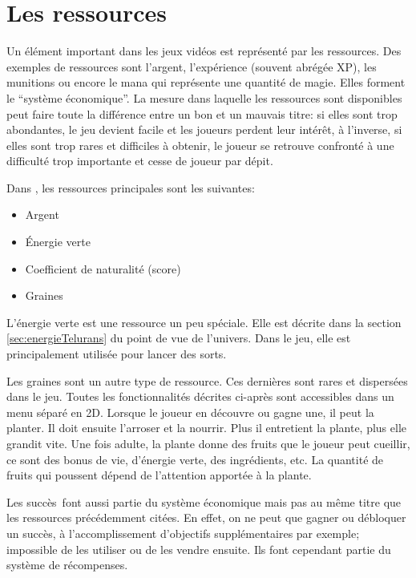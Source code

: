 \section{Les ressources}
Un élément important dans les jeux vidéos est représenté par les ressources. Des exemples de ressources sont l'argent, l'expérience (souvent abrégée XP), les munitions ou encore le mana qui représente une quantité de magie. Elles forment le \enquote{système économique}. La mesure dans laquelle les ressources sont disponibles peut faire toute la différence entre un bon et un mauvais titre: si elles sont trop abondantes, le jeu devient facile et les joueurs perdent leur intérêt, à l'inverse, si elles sont trop rares et difficiles à obtenir, le joueur se retrouve confronté à une difficulté trop importante et cesse de joueur par dépit.\cite{LevelUpTheGuidetoGreatVideoGameDesign_Rogers}

Dans \nomJeu, les ressources principales sont les suivantes:
\begin{itemize}
	\item Argent
	\item Énergie verte
	\item Coefficient de naturalité (score)
	\item Graines
\end{itemize}

L'énergie verte est une ressource un peu spéciale. Elle est décrite dans la section \ref{sec:energieTelurans} du point de vue de l'univers. Dans le jeu, elle est principalement utilisée pour lancer des sorts.

Les graines sont un autre type de ressource. Ces dernières sont rares et dispersées dans le jeu. Toutes les fonctionnalités décrites ci-après sont accessibles dans un menu séparé en 2D. Lorsque le joueur en découvre ou gagne une, il peut la planter. Il doit ensuite l'arroser et la nourrir. Plus il entretient la plante, plus elle grandit vite. Une fois adulte, la plante donne des fruits que le joueur peut cueillir, ce sont des bonus de vie, d'énergie verte, des ingrédients, etc. La quantité de fruits qui poussent dépend de l'attention apportée à la plante.

Les succès\ font aussi partie du système économique mais pas au même titre que les ressources précédemment citées. En effet, on ne peut que gagner ou débloquer un succès, à l'accomplissement d'objectifs supplémentaires par exemple; impossible de les utiliser ou de les vendre ensuite. Ils font cependant partie du système de récompenses.

